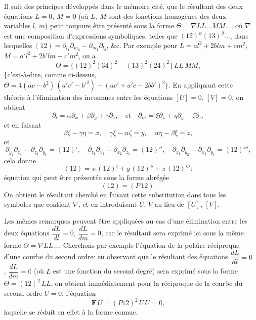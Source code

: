 \documentclass[11pt,a4paper]{book}
\begin{document}
Il suit des principes d\'evelopp\'es dans le m\'emoire cit\'e, que le r\'esultant des deux \'equations $L = 0$, $M = 0$ (o\`u $L$, $M$ sont des fonctions homog\`enes des deux variables $l$, $m$) peut toujours \^etre pr\'esent\'e sous la forme $\Theta = \nabla LL \ldots MM \ldots$, o\`u $\nabla$ est une composition d'expressions symboliques, telles que $(12)^{\alpha} (13)^{\beta} \ldots$, dans lesquelles $(12) = \partial_{l_1} \partial_{m_2} - \partial_{m_1} \partial_{l_2}$, \&c. Par exemple pour $L = al^2 + 2blm + cm^2$, $M = a'l^2 + 2b'lm + c'm^2$, on a
\[
\Theta = \{(12)^2 (34)^2 - (13)^2 (24)^2\}\, LL\, MM,
\]
\{c'est-\`a-dire, comme ci-dessus, $\Theta = 4(ac - b^2)\,(a'c' - b'^2) - (ac' + a'c - 2bb')^2\}$. En appliquant cette th\'eorie \`a l'\'elimination des inconnues entre les \'equations $[U] = 0$, $[V] = 0$, on obtient
\[
\partial_l = \alpha \partial_x + \beta \partial_y + \gamma \partial_z, \quad \text{et} \quad \partial_m = \xi \partial_x + \eta \partial_y + \zeta \partial_z,
\]
et en faisant
\[
\beta\zeta - \gamma\eta = x, \quad \gamma\xi - \alpha\zeta = y, \quad \alpha\eta - \beta\xi = z,
\]
et
\[
\partial_{y_1} \partial_{z_2} - \partial_{z_2} \partial_{y_1} = (12)', \quad \partial_{z_1} \partial_{x_2} - \partial_{x_2} \partial_{z_1} = (12)'', \quad \partial_{x_1} \partial_{y_2} - \partial_{x_2} \partial_{y_1} = (12)''',
\]
cela donne
\[
(12) = x\,(12)' + y\,(12)'' + z\,(12)''':
\]
\'equation qui peut \^etre pr\'esent\'ee sous la forme abr\'eg\'ee
\[
(12) = (P\,12).
\]
On obtient le r\'esultant cherch\'e en faisant cette substitution dans tous les symboles que contient $\nabla$, et en introduisant $U$, $V$ au lieu de $[U]$, $[V]$.

Les m\^emes remarques peuvent \^etre appliqu\'ees au cas d'une \'elimination entre les deux \'equations $\dfrac{dL}{dl} = 0$, $\dfrac{dL}{dm} = 0$, car le r\'esultant sera exprim\'e ici sous la m\^eme forme $\Theta = \nabla LL \ldots$. Cherchons par exemple l'\'equation de la polaire r\'eciproque d'une courbe du second ordre: en observant que le r\'esultant des \'equations $\dfrac{dL}{dl} = 0$, $\dfrac{dL}{dm} = 0$ (o\`u $L$ est une fonction du second degr\'e) sera exprim\'e sous la forme $\Theta = (12)^2\, LL$, on obtient imm\'ediatement pour la r\'eciproque de la courbe du second ordre $U = 0$, l'\'equation
\[
\mathbf{F}\,U = (P12)^2\, U\,U = 0,
\]
laquelle se r\'eduit en effet \`a la forme connue.
\end{document}
